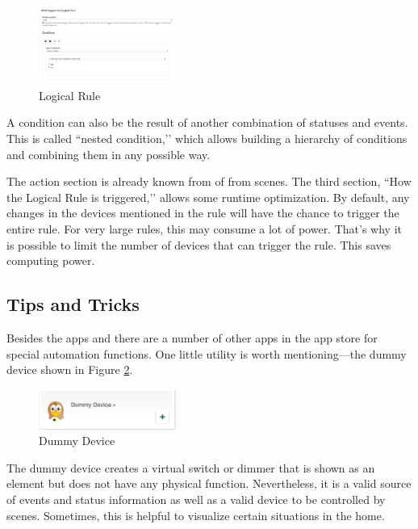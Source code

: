\begin{figure}
\begin{center}
\includegraphics[width=0.4\textwidth]{pngs/cap6/app14.png}
\caption{Logical Rule}
\label{app14}
\end{center}
\end{figure}

A condition can also be the result of another combination of statuses and events. This 
is called ``nested condition,’’ which allows building a hierarchy of conditions and 
combining them in any possible way.

The action section is already known from  of from scenes. The third section, 
``How the Logical Rule is triggered,’’ allows some runtime optimization.
By default, any changes in the devices mentioned in the rule will have the chance 
to trigger the entire rule. For very large rules, this may consume a lot of power. 
That’s why it is possible to limit the number of devices that can trigger the 
rule. This saves computing power.

\subsection{Tips and Tricks}

Besides the apps    and  there are 
a number of other apps in the app store for special automation functions. One 
little utility is worth mentioning---the dummy device shown in Figure \ref{app15}.

\begin{figure}
\begin{center}
\includegraphics[width=0.4\textwidth]{pngs/cap6/app15.png}
\caption{Dummy Device}
\label{app15}
\end{center}
\end{figure}

The dummy device creates a virtual switch or dimmer that is shown as an element but does 
not have any physical function. Nevertheless, it is a valid source of events and status 
information as well as a valid device to be controlled by scenes. Sometimes, this is 
helpful to visualize certain situations in the home.


